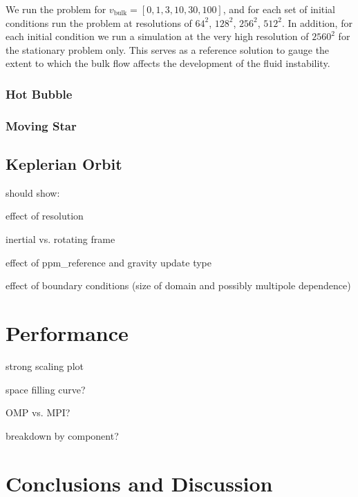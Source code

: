\documentclass{emulateapj}
\begin{document}
We run the problem for $v_\text{bulk} = [0, 1, 3, 10, 30, 100]$, and
for each set of initial conditions run the problem at resolutions of
$64^2$, $128^2$, $256^2$, $512^2$. In addition, for each initial
condition we run a simulation at the very high resolution of $2560^2$
for the stationary problem only. This serves as a reference solution
to gauge the extent to which the bulk flow affects the development of
the fluid instability.

\subsubsection{Hot Bubble}\label{sec:hot_bubble}

\subsubsection{Moving Star}\label{sed:moving_star}

\subsection{Keplerian Orbit}\label{sec:kepler}

should show:

effect of resolution

inertial vs. rotating frame

effect of ppm\_reference and gravity update type

effect of boundary conditions (size of domain and possibly multipole dependence)


\section{Performance}\label{sec:Performance}

strong scaling plot

space filling curve?

OMP vs. MPI?

breakdown by component?


\section{Conclusions and Discussion}\label{sec:Conclusions and Discussion}
\end{document}
